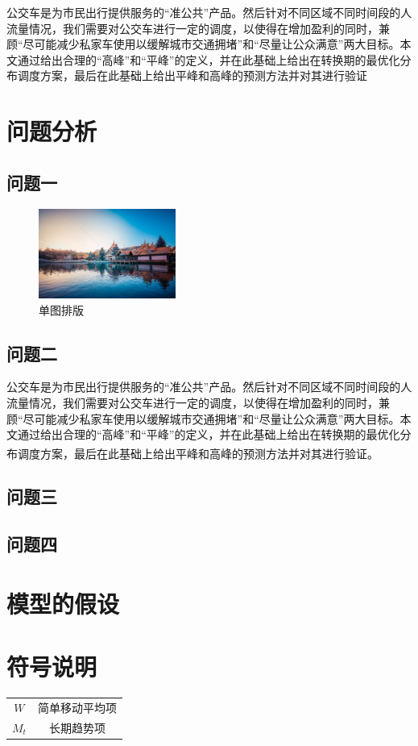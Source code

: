 \documentclass[12pt]{ctexart}
\newcommand\supercite[1]{\textsuperscript{\cite{#1}}}
\begin{document}
\begin{spacing}{1.5}
	公交车是为市民出行提供服务的“准公共”产品。然后针对不同区域不同时间段的人流量情况，我们需要对公交车进行一定的调度，以使得在增加盈利的同时，兼顾“尽可能减少私家车使用以缓解城市交通拥堵”和“尽量让公众满意”两大目标。本文通过给出合理的“高峰”和“平峰”的定义，并在此基础上给出在转换期的最优化分布调度方案，最后在此基础上给出平峰和高峰的预测方法并对其进行验证

\section{问题分析}
\subsection{问题一}
\begin{figure}[H]
	\centering
	\includegraphics[width=0.4\textwidth]{风景.jpg}
	\caption{单图排版}
	\label{image1}
\end{figure}
\subsection{问题二}
	公交车是为市民出行提供服务的“准公共”产品。然后针对不同区域不同时间段的人流量情况，我们需要对公交车进行一定的调度，以使得在增加盈利的同时，兼顾“尽可能减少私家车使用以缓解城市交通拥堵”和“尽量让公众满意”两大目标。本文通过给出合理的“高峰”和“平峰”的定义，并在此基础上给出在转换期的最优化分布调度方案，最后在此基础上给出平峰和高峰的预测方法并对其进行验证。\supercite{参考文献3}
\subsection{问题三}
\subsection{问题四}

\section{模型的假设}

\section{符号说明}
\begin{center}
	\begin{tabular}{cc}
		\toprule[1.5pt]
		\makebox[0.3\textwidth][c]{符号}	&  \makebox[0.4\textwidth][c]{意义} \\
		\midrule[0.5pt]
		$ W $	    & 简单移动平均项 \\
		$ M_t $	    & 长期趋势项 \\
		\bottomrule[1.5pt]
	\end{tabular}
\end{center}


\end{spacing}
\end{document}

